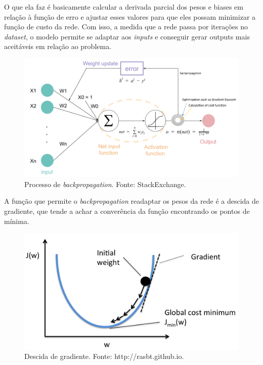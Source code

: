 O que ela faz é basicamente calcular a derivada parcial dos pesos e biases em relação à função de erro e ajustar esses valores para que eles possam minimizar a função de custo da rede. Com isso, a medida que a rede passa por iterações no \textit{dataset}, o modelo permite se adaptar aos \textit{inputs} e conseguir gerar outputs mais aceitáveis em relação ao problema.

\begin{figure}[H]
  \centering
  \includegraphics[scale=0.4]{figuras/backprop.png}
  \caption{Processo de \textit{backpropagation}. Fonte: StackExchange.}
  \label{fig:backprop}
\end{figure}

A função que permite o \textit{backpropagation} readaptar os pesos da rede é a descida de gradiente, que tende a achar a converência da função encontrando os pontos de mínima.

\begin{figure}[H]
  \centering
  \includegraphics[scale=0.2]{figuras/gradient-descent.png}
  \caption{Descida de gradiente. Fonte: http://rasbt.github.io.}
  \label{fig:gradient-descent}
\end{figure}

